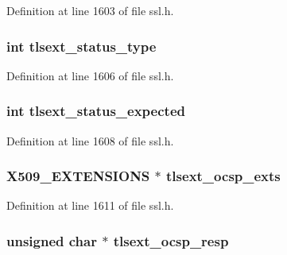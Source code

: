 Definition at line 1603 of file ssl.\+h.

\subsubsection[{\texorpdfstring{tlsext\+\_\+status\+\_\+type}{tlsext_status_type}}]{\setlength{\rightskip}{0pt plus 5cm}int tlsext\+\_\+status\+\_\+type}\hypertarget{structssl__st_a981150d76650d75fe7f86c78b13a77b5}{}\label{structssl__st_a981150d76650d75fe7f86c78b13a77b5}


Definition at line 1606 of file ssl.\+h.

\subsubsection[{\texorpdfstring{tlsext\+\_\+status\+\_\+expected}{tlsext_status_expected}}]{\setlength{\rightskip}{0pt plus 5cm}int tlsext\+\_\+status\+\_\+expected}\hypertarget{structssl__st_a347ff47b970daa8671cbf686b3abdb5c}{}\label{structssl__st_a347ff47b970daa8671cbf686b3abdb5c}


Definition at line 1608 of file ssl.\+h.

\subsubsection[{\texorpdfstring{tlsext\+\_\+ocsp\+\_\+exts}{tlsext_ocsp_exts}}]{\setlength{\rightskip}{0pt plus 5cm}X509\+\_\+\+E\+X\+T\+E\+N\+S\+I\+O\+NS $\ast$ tlsext\+\_\+ocsp\+\_\+exts}\hypertarget{structssl__st_ae5f42d44ee95f29c3a04b8f54561e488}{}\label{structssl__st_ae5f42d44ee95f29c3a04b8f54561e488}


Definition at line 1611 of file ssl.\+h.

\subsubsection[{\texorpdfstring{tlsext\+\_\+ocsp\+\_\+resp}{tlsext_ocsp_resp}}]{\setlength{\rightskip}{0pt plus 5cm}unsigned char $\ast$ tlsext\+\_\+ocsp\+\_\+resp}\hypertarget{structssl__st_a3b89eb0047a380869844f83411a243eb}{}\label{structssl__st_a3b89eb0047a380869844f83411a243eb}


